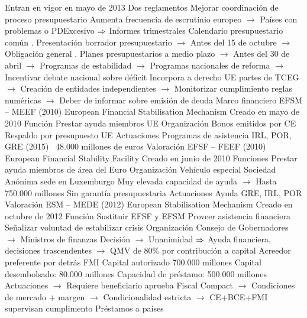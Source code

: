 \documentclass{nuevotema}
\begin{document}
\begin{esquemal}
				\4 Entran en vigor en mayo de 2013
				\4 Dos reglamentos
				\4 Mejorar coordinación de proceso presupuestario
				\4[] Aumenta frecuencia de escrutinio europeo
				\4[] $\to$ Países con problemas o PDExcesivo
				\4[] $\Rightarrow$ Informes trimestrales
				\4[] Calendario presupuestario común
				. Presentación borrador presupuestario
				\4[] $\to$ Antes del 15 de octubre
				\4[] $\to$ Obligación general
				. Planes presupuestarios a medio plazo
				\4[] $\to$ Antes del 30 de abril
				\4[] $\to$ Programas de estabilidad
				\4[] $\to$ Programas nacionales de reforma
				\4[] $\to$ Incentivar debate nacional sobre déficit
				\4 Incorpora a derecho UE partes de TCEG
				\4[] $\to$ Creación de entidades independientes
				\4[] $\to$ Monitorizar cumplimiento reglas numéricas
				\4[] $\to$ Deber de informar sobre emisión de deuda
		\2 Marco financiero
			\3 EFSM -- MEEF (2010)
				\4 European Financial Stabilisation Mechanism
				\4 Creado en mayo de 2010
				\4 Función
				\4[] Prestar ayuda miembros UE
				\4 Organización
				\4[] Bonos emitidos por CE
				\4[] Respaldo por presupuesto UE
				\4 Actuaciones
				\4[] Programas de asistencia
				\4[] IRL, POR, GRE (2015)
				\4[] ~48.000 millones de euros
				\4 Valoración
			\3 EFSF -- FEEF (2010)
				\4 European Financial Stability Facility
				\4 Creado en junio de 2010
				\4 Funciones
				\4[] Prestar ayuda miembros de área del Euro
				\4 Organización
				\4[] Vehículo especial
				\4[] Sociedad Anónima sede en Luxemburgo
				\4[] Muy elevada capacidad de ayuda
				\4[] $\to$ Hasta 750.000 millones
				\4[] Sin garantía presupuestaria
				\4 Actuaciones
				\4[] Ayuda GRE, IRL, POR
				\4 Valoración
			\3 ESM -- MEDE (2012)
				\4 European Stabilisation Mechanism
				\4 Creado en octubre de 2012
				\4 Función
				\4[] Sustituir EFSF y EFSM
				\4[] Proveer asistencia financiera
				\4[] Señalizar voluntad de estabilizar crisis
				\4 Organización
				\4[] Consejo de Gobernadores
				\4[] $\to$ Ministros de finanzas
				\4[] Decisión
				\4[] $\to$ Unanimidad
				\4[] $\Rightarrow$ Ayuda financiera, decisiones trascendentes
				\4[] $\to$ QMV de 80\% por contribución a capital
				\4[] Acreedor preferente por detrás FMI
				\4[] Capital autorizado 700.000 millones
				\4[] Capital desembolsado: 80.000 millones
				\4[] Capacidad de préstamo: 500.000 millones
				\4 Actuaciones
				\4[] $\to$ Requiere beneficiario aprueba Fiscal Compact
				\4[] $\to$ Condiciones de mercado + margen
				\4[] $\to$ Condicionalidad estricta
				\4[] $\to$ CE+BCE+FMI supervisan cumplimento
				\4[] Préstamos a países

\end{esquemal}
\end{document}
